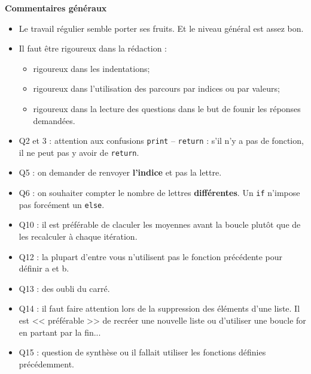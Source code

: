 \documentclass[10pt,fleqn]{article} %
\begin{document}
\textbf{Commentaires généraux}
\begin{itemize}
\item Le travail régulier semble porter ses fruits. Et le niveau général est assez bon.
\item Il faut être rigoureux dans la rédaction : 
\begin{itemize}
\item rigoureux dans les indentations;
\item rigoureux dans l'utilisation des parcours par indices ou par valeurs;
\item rigoureux dans la lecture des questions dans le but de founir les réponses demandées.
\end{itemize}
\item Q2 et 3 : attention aux confusions \lstinline{print} -- \lstinline{return} : s'il n'y a pas de fonction, il ne peut pas y avoir de \lstinline{return}.
\item Q5 : on demander de renvoyer \textbf{l'indice} et pas la lettre.
\item Q6 : on souhaiter compter le nombre de lettres \textbf{différentes}. Un \lstinline{if} n'impose pas forcément un \lstinline{else}.
\item Q10 : il est préférable de claculer les moyennes avant la boucle plutôt que de les recalculer à chaque itération.
\item Q12 : la plupart d'entre vous n'utilisent pas le fonction précédente pour définir a et b.
\item Q13 : des oubli du carré.
\item Q14 : il faut faire attention lors de la suppression des éléments d'une liste. Il est << préférable >> de recréer une nouvelle liste ou d'utiliser une boucle for en partant par la fin...
\item Q15 : question de synthèse ou il fallait utiliser les fonctions définies précédemment.
\end{itemize}






%
\end{document}
